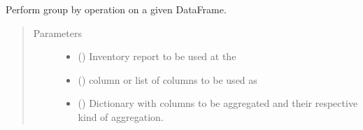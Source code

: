 \documentclass[letterpaper,10pt,english]{sphinxmanual}
\begin{document}
\begin{fulllineitems}
\label{\detokenize{source/optimization.datatools:optimization.datatools.dataprep.group_by}}
Perform group by operation on a given DataFrame.
\begin{quote}\begin{description}
\item[{Parameters}] \leavevmode\begin{itemize}
\item {} 
 () \textendash{} Inventory report to be used at the 

\item {} 
 (\sphinxstyleliteralemphasis{\sphinxupquote{{[}}}\sphinxstyleliteralemphasis{\sphinxupquote{, }}\sphinxstyleliteralemphasis{\sphinxupquote{{]}}}) \textendash{} column or list of columns to be used as 

\item {} 
 () \textendash{} Dictionary with columns to be aggregated and their respective kind of aggregation.

\end{itemize}

\end{description}\end{quote}

\end{fulllineitems}

\end{document}
